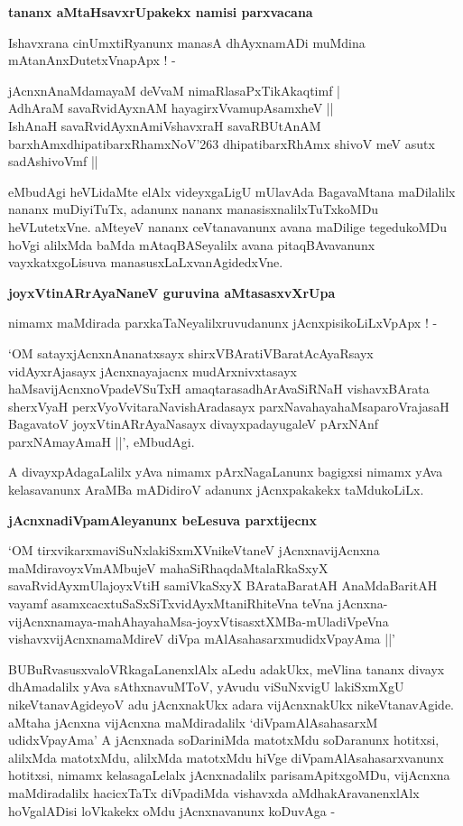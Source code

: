 {\bigskip
\noindent
{\large\bf tananx aMtaHsavxrUpakekx namisi parxvacana}}\label{80b}
\medskip

\noindent
Ishavxrana cinUmxtiRyanunx manasA dhAyxnamADi muMdina mAtanAnxDutetxVnapApx ! -

\begin{shloka}
jAcnxnAnaMdamayaM deVvaM nimaRlasaPxTikAkaqtimf |\\\label{80c}
AdhAraM savaRvidAyxnAM hayagirxVvamupAsamxheV ||\\

IshAnaH savaRvidAyxnAmiVshavxraH savaRBUtAnAM\\\label{80d}
barxhAmxdhipatibarxRhamxNoV\char'263 dhipatibarxRhAmx shivoV meV asutx sadAshivoVmf ||
\end{shloka}

eMbudAgi heVLidaMte elAlx videyxgaLigU mUlavAda BagavaMtana maDilalilx nananx muDiyiTuTx, adanunx nananx manasisxnalilxTuTxkoMDu heVLutetxVne. aMteyeV nananx ceVtanavanunx avana maDilige tegedukoMDu hoVgi alilxMda baMda mAtaqBASeyalilx avana pitaqBAvavanunx vayxkatxgoLisuva manasusxLaLxvanAgidedxVne.

{\bigskip
\noindent
{\large\bf joyxVtinARrAyaNaneV guruvina aMtasasxvXrUpa}}\label{80e}
\medskip

nimamx maMdirada parxkaTaNeyalilxruvudanunx jAcnxpisikoLiLxVpApx ! - 

`OM satayxjAcnxnAnanatxsayx shirxVBAratiVBaratAcAyaRsayx vidAyxrAjasayx jAcnxnayajacnx mudArxnivxtasayx haMsavijAcnxnoVpadeVSuTxH amaqtarasadhArAvaSiRNaH vishavxBArata sherxVyaH perxVyoVvitaraNavishAradasayx parxNavahayahaMsaparoVrajasaH BagavatoV joyxVtinARrAyaNasayx divayxpadayugaleV pArxNAnf parxNAmayAmaH ||', eMbudAgi.


A divayxpAdagaLalilx yAva nimamx pArxNagaLanunx bagigxsi nimamx yAva kelasavanunx AraMBa mADidiroV adanunx jAcnxpakakekx taMdukoLiLx.

{\bigskip
\noindent
{\large\bf jAcnxnadiVpamAleyanunx beLesuva parxtijecnx}}\label{page81}
\medskip

\noindent
`OM tirxvikarxmaviSuNxlakiSxmXVnikeVtaneV\label{81} jAcnxnavijAcnxna maMdiravoyxVmAMbujeV mahaSiRhaqdaMtalaRkaSxyX savaRvidAyxmUlajoyxVtiH samiVkaSxyX BArataBaratAH AnaMdaBaritAH vayamf asamxcacxtuSaSxSiTxvidAyxMtaniRhiteVna teVna jAcnxna-vijAcnxnamaya-mahAhayahaMsa-joyxVtisasxtXMBa-mUladiVpeVna vishavxvijAcnxnamaMdireV diVpa mAlAsahasarxmudidxVpayAma ||'

BUBuRvasusxvaloVRkagaLanenxlAlx aLedu adakUkx, meVlina tananx divayx dhAmadalilx yAva sAthxnavuMToV, yAvudu viSuNxvigU lakiSxmXgU nikeVtanavAgideyoV adu jAcnxnakUkx adara vijAcnxnakUkx nikeVtanavAgide. aMtaha jAcnxna vijAcnxna maMdiradalilx `diVpamAlAsahasarxM udidxVpayAma' A jAcnxnada soDariniMda matotxMdu soDaranunx hotitxsi, alilxMda matotxMdu, alilxMda matotxMdu hiVge diVpamAlAsahasarxvanunx hotitxsi, nimamx kelasagaLelalx jAcnxnadalilx parisamApitxgoMDu, vijAcnxna maMdiradalilx hacicxTaTx diVpadiMda vishavxda aMdhakAravanenxlAlx hoVgalADisi loVkakekx oMdu jAcnxnavanunx koDuvAga - 

